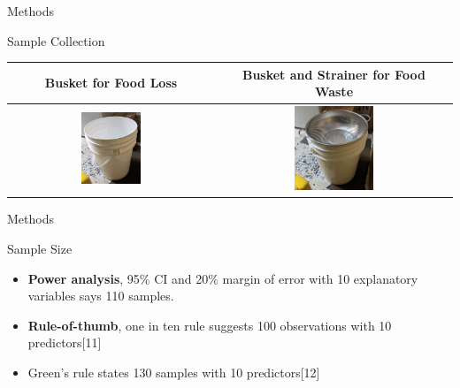 \documentclass[
  ignorenonframetext,
]{beamer}
\providecommand{\tightlist}{%
  \setlength{\itemsep}{0pt}\setlength{\parskip}{0pt}}
\begin{document}
\begin{frame}{Methods}
\protect\hypertarget{methods-2}{}
\begin{block}{Sample Collection}
\protect\hypertarget{sample-collection}{}
\begin{longtable}[]{@{}cc@{}}
\toprule()
Busket for Food Loss & Busket and Strainer for Food Waste \\
\midrule()
\endhead
\includegraphics[width=0.3\textwidth,height=\textheight]{busket.jpg} &
\includegraphics[width=0.35\textwidth,height=\textheight]{busketStrainer.jpg} \\
\bottomrule()
\end{longtable}
\end{block}
\end{frame}

\begin{frame}{Methods}
\protect\hypertarget{methods-3}{}
\begin{block}{Sample Size}
\protect\hypertarget{sample-size}{}
\begin{itemize}
\tightlist
\item
  \textbf{Power analysis}, 95\% CI and 20\% margin of error with 10
  explanatory variables says 110 samples.
\item
  \textbf{Rule-of-thumb}, one in ten rule suggests 100 observations with
  10 predictors{[}11{]}
\item
  Green's rule states 130 samples with 10 predictors{[}12{]}
\end{itemize}
\end{block}
\end{frame}
\end{document}
